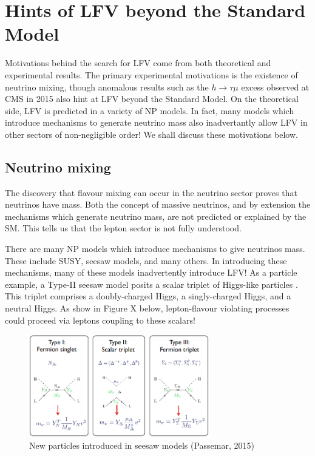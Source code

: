 \documentclass[12pt]{thesis}  %
\newcommand{\htm}{h\to \tau \mu}
\begin{document}
\section{Hints of LFV beyond the Standard Model}

Motivations behind the search for LFV come from both theoretical and experimental results. The primary experimental motivations is the existence of neutrino mixing, though anomalous results such as the $\htm$ excess observed at CMS in 2015 also hint at LFV beyond the Standard Model. On the theoretical side, LFV is predicted in a variety of NP models. In fact, many models which introduce mechanisms to generate neutrino mass also inadvertantly allow LFV in other sectors of non-negligible order! We shall discuss these motivations below.


\subsection{Neutrino mixing}

The discovery that flavour mixing can occur in the neutrino sector \cite{SuperK:1998}\cite{SNO:2002} proves that neutrinos have mass. Both the concept of massive neutrinos, and by extension the mechanisms which generate neutrino mass, are not predicted or explained by the SM. This tells us that the lepton sector is not fully understood.

There are many NP models which introduce mechanisms to give neutrinos mass. These include SUSY, seesaw models, and many others. In introducing these mechanisms, many of these models inadvertently introduce LFV! As a particle example, a Type-II seesaw model posits a scalar triplet of Higgs-like particles \cite{Passemar:2015}. This triplet comprises a doubly-charged Higgs, a singly-charged Higgs, and a neutral Higgs. As show in Figure X below, lepton-flavour violating processes could proceed via leptons coupling to these scalars!


\begin{figure}[h]
\centering
\includegraphics[width=0.7\textwidth]{images/seesaw.png}
\caption{New particles introduced in seesaw models (Passemar, 2015)}
\label{}
\end{figure}
\end{document}

